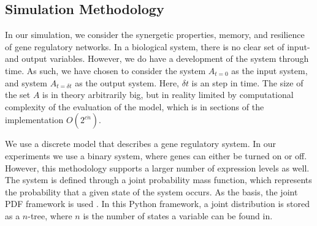 \documentclass[../main.tex]{subfiles}
\begin{document}
\subsection{Simulation Methodology}

In our simulation, we consider the synergetic properties, memory, and resilience of gene regulatory networks.
In a biological system, there is no clear set of input- and output variables.
However, we do have a development of the system through time.
As such, we have chosen to consider the system $A_{t=0}$ as the input system, and system $A_{t=\delta t}$ as the output system.
Here, $\delta t$ is an step in time. %
The size of the set $A$ is in theory arbitrarily big, but in reality limited by computational complexity of the evaluation of the model, which is in sections of the implementation $O(2^{c \dot n})$.

We use a discrete model that describes a gene regulatory system.
In our experiments we use a binary system, where genes can either be turned on or off.
However, this methodology supports a larger number of expression levels as well.
The system is defined through a joint probability mass function, which represents the probability that a given state of the system occurs.
As the basis, the joint PDF framework is used \cite{jointpdf}.
In this Python framework, a joint distribution is stored as a $n$-tree, where $n$ is the number of states a variable can be found in.
\end{document}

